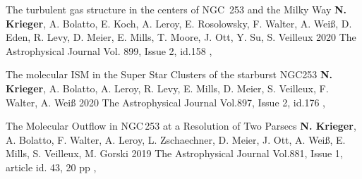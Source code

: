 \publication
	{The turbulent gas structure in the centers of NGC~253 and the Milky Way} %
	{\textbf{N. Krieger}, A. Bolatto, E. Koch, A. Leroy, E. Rosolowsky, F. Walter, A. Wei\ss, D. Eden, R. Levy, D. Meier, E. Mills, T. Moore, J. Ott, Y. Su, S. Veilleux} %
	{2020} %
	{The Astrophysical Journal Vol. 899, Issue 2, id.158} %
	{, } %

\publication
	{The molecular ISM in the Super Star Clusters of the starburst NGC253} %
	{\textbf{N. Krieger}, A. Bolatto, A. Leroy, R. Levy, E. Mills, D. Meier, S. Veilleux, F. Walter, A. Wei\ss} %
	{2020} %
	{The Astrophysical Journal Vol.897, Issue 2, id.176} %
	{, } %

\publication
	{The Molecular Outflow in NGC\,253 at a Resolution of Two Parsecs} %
	{\textbf{N. Krieger}, A. Bolatto, F. Walter, A. Leroy, L. Zschaechner, D. Meier, J. Ott, A. Wei\ss, E. Mills, S. Veilleux, M. Gorski} %
	{2019} %
	{The Astrophysical Journal Vol.881, Issue 1, article id. 43, 20 pp} %
	{, } %
